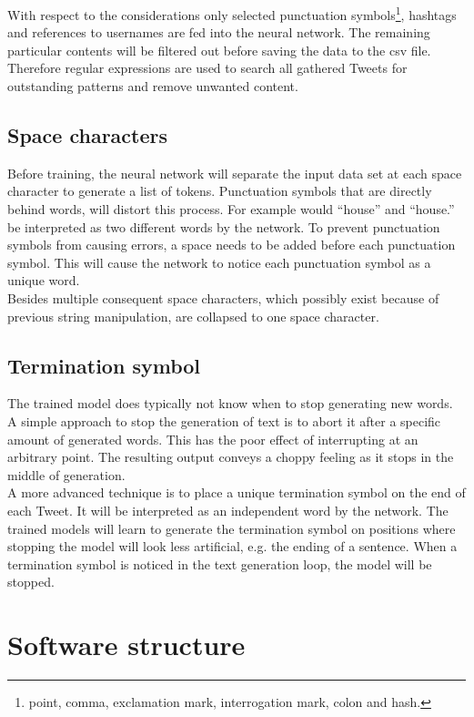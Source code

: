 \documentclass[conference]{IEEEtran}
\begin{document}
With respect to the considerations only selected punctuation symbols\footnote{point, comma, exclamation mark, interrogation mark, colon and hash.},  hashtags and references to usernames are fed into the neural network. The remaining particular contents will be filtered out before saving the data to the csv file. Therefore regular expressions are used to search all gathered Tweets for outstanding patterns and remove unwanted content.

\subsection{Space characters}\label{subsec_space_characters}

Before training, the neural network will separate the input data set at each space character to generate a list of tokens. Punctuation symbols that are directly behind words, will distort this process. For example would ``house'' and ``house.'' be interpreted as two different words by the network. To prevent punctuation symbols from causing errors, a space needs to be added before each punctuation symbol. This will cause the network to notice each punctuation symbol as a unique word.\\
Besides multiple consequent space characters, which possibly exist because of previous string manipulation, are collapsed to one space character.

\subsection{Termination symbol}\label{subsec_termination_symbol}

The trained model does typically not know when to stop generating new words. A simple approach to stop the generation of text is to abort it after a specific amount of generated words. This has the poor effect of interrupting at an arbitrary point. The resulting output conveys a choppy feeling as it stops in the middle of generation.\\
A more advanced technique is to place a unique termination symbol on the end of each Tweet. It will be interpreted as an independent word by the network. The trained models will learn to generate the termination symbol on positions where stopping the model will look less artificial, e.g. the ending of a sentence. When a termination symbol is noticed in the text generation loop, the model will be stopped.

\section{Software structure}
\end{document}
